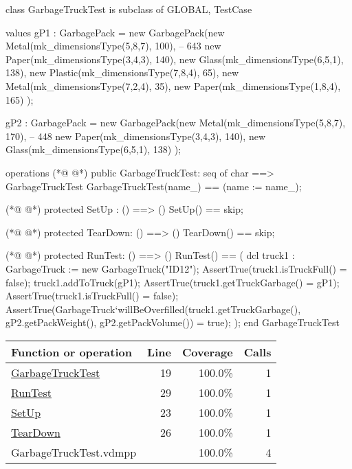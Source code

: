 \begin{vdmpp}[breaklines=true]
class GarbageTruckTest is subclass of GLOBAL, TestCase

values 
gP1 : GarbagePack = new GarbagePack({new Metal(mk_dimensionsType(5,8,7), 100), -- 643
                                     new Paper(mk_dimensionsType(3,4,3), 140),
                                     new Glass(mk_dimensionsType(6,5,1), 138),
                                     new Plastic(mk_dimensionsType(7,8,4), 65),
                                     new Metal(mk_dimensionsType(7,2,4), 35),
                                     new Paper(mk_dimensionsType(1,8,4), 165)
                                     });

gP2 : GarbagePack = new GarbagePack({new Metal(mk_dimensionsType(5,8,7), 170), -- 448
                                     new Paper(mk_dimensionsType(3,4,3), 140),
                                     new Glass(mk_dimensionsType(6,5,1), 138)
                                     });


operations
(*@
\label{GarbageTruckTest:19}
@*)
    public GarbageTruckTest: seq of char ==> GarbageTruckTest
    GarbageTruckTest(name_) ==
    (name := name_);

(*@
\label{SetUp:23}
@*)
    protected SetUp : () ==> ()
    SetUp() == skip;

(*@
\label{TearDown:26}
@*)
    protected TearDown: () ==> ()
    TearDown() == skip;

(*@
\label{RunTest:29}
@*)
    protected RunTest: () ==> ()
    RunTest() ==
    (
        dcl truck1 : GarbageTruck := new GarbageTruck("ID12");
        AssertTrue(truck1.isTruckFull() = false);
        truck1.addToTruck(gP1);
        AssertTrue(truck1.getTruckGarbage() = {gP1});
        AssertTrue(truck1.isTruckFull() = false);
        AssertTrue(GarbageTruck`willBeOverfilled(truck1.getTruckGarbage(), gP2.getPackWeight(), gP2.getPackVolume()) = true);
    );
end GarbageTruckTest
\end{vdmpp}
\bigskip
\begin{longtable}{|l|r|r|r|}
\hline
Function or operation & Line & Coverage & Calls \\
\hline
\hline
\hyperref[GarbageTruckTest:19]{GarbageTruckTest} & 19&100.0\% & 1 \\
\hline
\hyperref[RunTest:29]{RunTest} & 29&100.0\% & 1 \\
\hline
\hyperref[SetUp:23]{SetUp} & 23&100.0\% & 1 \\
\hline
\hyperref[TearDown:26]{TearDown} & 26&100.0\% & 1 \\
\hline
\hline
GarbageTruckTest.vdmpp & & 100.0\% & 4 \\
\hline
\end{longtable}

